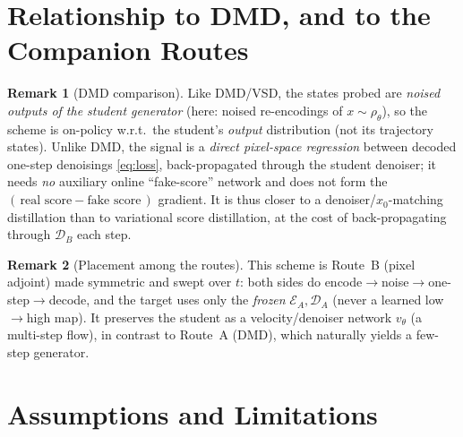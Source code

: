 \documentclass[11pt,a4paper]{article}
\newcommand{\Enc}{\mathcal{E}}
\newcommand{\Dec}{\mathcal{D}}
\theoremstyle{definition}
\newtheorem{remark}{Remark}
\begin{document}
\section{Relationship to DMD, and to the Companion Routes}
\label{sec:relations}

\begin{remark}[DMD comparison]
\label{rem:dmd}
Like DMD/VSD, the states probed are \emph{noised outputs of the student generator} (here: noised
re-encodings of $x\sim\rho_\theta$), so the scheme is on-policy w.r.t.\ the student's \emph{output}
distribution (not its trajectory states). Unlike DMD, the signal is a \emph{direct pixel-space
regression} between decoded one-step denoisings \eqref{eq:loss}, back-propagated through the
student denoiser; it needs \emph{no} auxiliary online ``fake-score'' network and does not form the
$(\,\text{real score}-\text{fake score}\,)$ gradient. It is thus closer to a denoiser/$x_0$-matching
distillation than to variational score distillation, at the cost of back-propagating through
$\Dec_B$ each step.
\end{remark}

\begin{remark}[Placement among the routes]
\label{rem:placement}
This scheme is Route~B (pixel adjoint) made symmetric and swept over $t$: both sides do
encode$\to$noise$\to$one-step$\to$decode, and the target uses only the \emph{frozen}
$\Enc_A,\Dec_A$ (never a learned low$\to$high map). It preserves the student as a
velocity/denoiser network $v_\theta$ (a multi-step flow), in contrast to Route~A (DMD), which
naturally yields a few-step generator.
\end{remark}

\section{Assumptions and Limitations}
\label{sec:limits}
\end{document}
